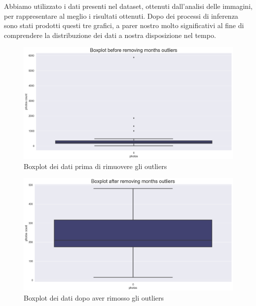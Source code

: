 \documentclass[12pt,a4paper,twoside]{article}
\begin{document}
Abbiamo utilizzato i dati presenti nel dataset, ottenuti dall'analisi delle immagini, per 
rappresentare al meglio i risultati ottenuti. Dopo dei processi di inferenza sono stati prodotti 
questi tre grafici, a parer nostro molto significativi al fine di comprendere la distribuzione 
dei dati a nostra disposizione nel tempo. \\
\begin{figure}[!ht]
    \centering
    \includegraphics[width=\textwidth, height=\textheight, keepaspectratio]{assets/boxplot-outliers.png}
    \caption{Boxplot dei dati prima di rimuovere gli outliers}
    \label{fig:boxplot-outliers}
\end{figure}
\begin{figure}[!ht]
    \centering
    \includegraphics[width=\textwidth, height=\textheight, keepaspectratio]{assets/boxplot-wout-outliers.png}
    \caption{Boxplot dei dati dopo aver rimosso gli outliers}
    \label{fig:boxplot-wout-outliers}
\end{figure}
\end{document}
